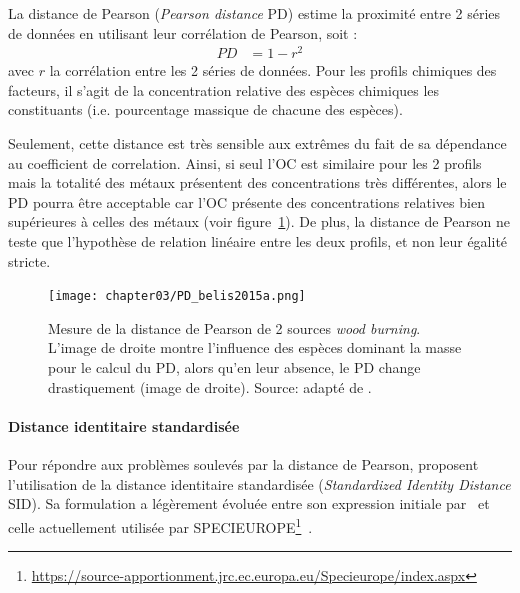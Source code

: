 La distance de Pearson (\textit{Pearson distance} PD) estime la proximité entre 2 séries
de données en utilisant leur corrélation de Pearson, soit :
\begin{align}
    \label{eq:PD}
    PD &= 1 - r^2
\end{align}
avec $r$ la corrélation entre les 2 séries de données. Pour les profils chimiques des
facteurs, il s'agit de la concentration relative des espèces chimiques les constituants
(i.e. pourcentage massique de chacune des espèces).

Seulement, cette distance est très sensible aux extrêmes du fait de sa dépendance au
coefficient de correlation. Ainsi, si seul l'OC est similaire pour les 2 profils mais la
totalité des métaux présentent des concentrations très différentes, alors le PD pourra
être acceptable car l'OC présente des concentrations relatives bien supérieures à celles
des métaux (voir figure~\ref{fig:chapter03/PD_belis2015a}).
De plus, la distance de Pearson ne teste que l'hypothèse de relation linéaire entre les
deux profils, et non leur égalité stricte.

\begin{figure}[ht]
    \centering
    \texttt{[image: chapter03/PD\_belis2015a.png]}
    \caption{Mesure de la distance de Pearson de 2 sources \textit{wood burning}. L'image
        de droite montre l'influence des espèces dominant la masse pour le calcul du PD, alors
        qu'en leur absence, le PD change drastiquement (image de droite). Source: adapté de
        \cite[figure 3]{belisNew2015}.
}%
    \label{fig:chapter03/PD_belis2015a}
\end{figure}


\paragraph{Distance identitaire standardisée}%
\label{par:distance_identitaire_standardisée}

Pour répondre aux problèmes soulevés par la distance de Pearson, \cite{belisNew2015}
proposent l'utilisation de la distance identitaire standardisée (\textit{Standardized
Identity Distance} SID). Sa formulation a légèrement évoluée entre son expression
initiale par~\cite{belisNew2015} et celle actuellement utilisée par
SPECIEUROPE\footnote{\url{https://source-apportionment.jrc.ec.europa.eu/Specieurope/index.aspx}}~\autocite{pernigottiSPECIEUROPE2016,pernigottiDeltaSA2018}.

